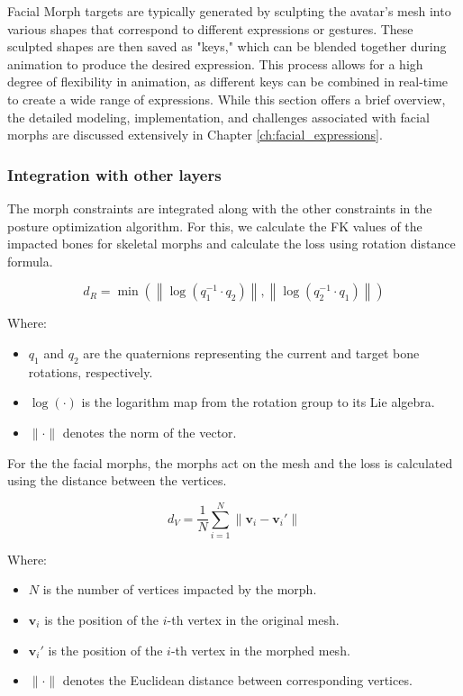 \documentclass[../../main.tex]{subfiles}
\begin{document}
Facial Morph targets are typically generated by sculpting the avatar's mesh into various shapes that correspond to different expressions or gestures. These sculpted shapes are then saved as "keys," which can be blended together during animation to produce the desired expression. This process allows for a high degree of flexibility in animation, as different keys can be combined in real-time to create a wide range of expressions. While this section offers a brief overview, the detailed modeling, implementation, and challenges associated with facial morphs are discussed extensively in Chapter \ref{ch:facial_expressions}.

\subsubsection{Integration with other layers}
\label{ch:rigging_layers:proc_rig_signing_avatars:morph_constraints:intergation}

The morph constraints are integrated along with the other constraints in the posture optimization algorithm. For this, we calculate the FK values of the impacted bones for skeletal morphs and calculate the loss using rotation distance formula.

\[
d_R = \min\left(\left\| \log\left(q_1^{-1} \cdot q_2\right) \right\|, \left\| \log\left(q_2^{-1} \cdot q_1\right) \right\|\right)
\]

Where:
\begin{itemize}
    \item \( q_1 \) and \( q_2 \) are the quaternions representing the current and target bone rotations, respectively.
    \item \( \log(\cdot) \) is the logarithm map from the rotation group to its Lie algebra.
    \item \( \|\cdot\| \) denotes the norm of the vector.
\end{itemize}

For the the facial morphs, the morphs act on the mesh and the loss is calculated using the distance between the vertices.

\[
d_V = \frac{1}{N} \sum_{i=1}^{N} \| \mathbf{v}_i - \mathbf{v}_i' \|
\]

Where:
\begin{itemize}
    \item \( N \) is the number of vertices impacted by the morph.
    \item \( \mathbf{v}_i \) is the position of the \( i \)-th vertex in the original mesh.
    \item \( \mathbf{v}_i' \) is the position of the \( i \)-th vertex in the morphed mesh.
    \item \( \|\cdot\| \) denotes the Euclidean distance between corresponding vertices.
\end{itemize}
\end{document}
